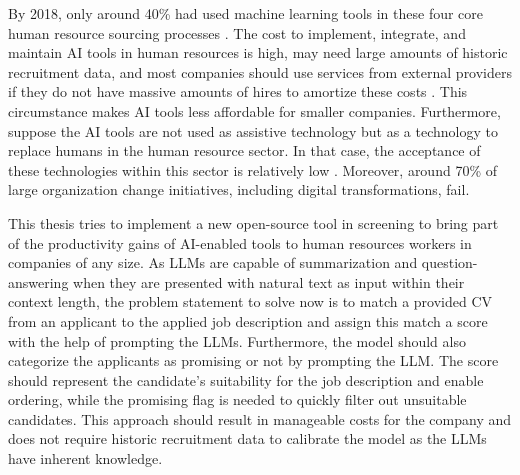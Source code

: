 \documentclass[draft,final]{thesisclass} %
\begin{document}
By 2018, only around 40\% had used machine learning tools in these four core human resource sourcing processes \parencite[4]{ai_recruiting}.
The cost to implement, integrate, and maintain \acs{AI} tools in human resources is high, may need large amounts of historic recruitment data, and most companies should use services from external providers if they do not have massive amounts of hires to amortize these costs \parencite[8]{ai_recruiting}.
This circumstance makes \acs{AI} tools less affordable for smaller companies.
Furthermore, suppose the \acs{AI} tools are not used as assistive technology but as a technology to replace humans in the human resource sector. In that case, the acceptance of these technologies within this sector is relatively low \parencite[9]{ai_recruiting}.
Moreover, around 70\% of large organization change initiatives, including digital transformations, fail.

This thesis tries to implement a new open-source tool in screening to bring part of the productivity gains of \acs{AI}-enabled tools to human resources workers in companies of any size.
As \gls{LLM}s are capable of summarization and question-answering when they are presented with natural text as input within their context length, the problem statement to solve now is to match a provided \acs{CV} from an applicant to the applied job description and assign this match a score with the help of prompting the \gls{LLM}s.
Furthermore, the model should also categorize the applicants as promising or not by prompting the \gls{LLM}.
The score should represent the candidate's suitability for the job description and enable ordering, while the promising flag is needed to quickly filter out unsuitable candidates.
This approach should result in manageable costs for the company and does not require historic recruitment data to calibrate the model as the \gls{LLM}s have inherent knowledge.
\end{document}
